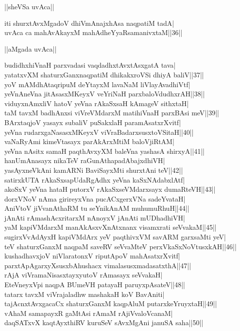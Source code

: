 \documentclass{article}
\begin{document}
\begin{center}
||sheVSa uvAca||
\end{center}

iti shurxtAvxMgadoV dhiVmAnajxhAsa naqpatiM tadA|\\
uvAca ca mahAvAkayxM mahAdheYyaRsamanivxtaM||36||\\

\begin{center}
||aMgada uvAca||
\end{center}

budidhxhiVnaH parxvadasi vaqdadhxtAvxtAsxgatA tava|\\
yatatxvXM shaturxGanxnaqpatiM dhikakxroVSi dhiyA baliV||37||\\
yoV mAMdhAtaqripuM deYtayxM lavaNaM liVlayAvadhiVtf|\\
yeVnAneVna jitAsasxMKeyxV veYriNaH parxbaloVdudhxrAH||38||\\
viduyxnAmxliV hatoV yeVna rAkaSxsaH kAmageV sithxtaH|\\
taM tavxM badhAnxsi viVreVMdarxM matihiVnaH parxBAsi meV||39||\\
BArxtaqjoV yasayx subaliV puSakxlaH paramAsatxrXvitf|\\
yeVna rudarxgaNasasxMKeyxV viVraBadarxsusxtoVSitaH||40||\\
vaNaRyAmi kimeVtasayx parAkArxMtiM baloVjiRtAM|\\
yeVna nAsitx samaH paqthAvxyXM baleVna yashasA shirxyA||41||\\
hanUmAnasayx nikaTeV raGunAthapadAbajxdhiVH|\\
yasAyxneVkAni kamARNi BaviSayxMti shurxtAni teV||42||\\
satirxkUTA rAkaSxsapUdaRgAdhx yeVna kaSxNAdabxlAtf|\\
akoSxV yeVna hataH putorxV rAkaSxseVMdarxsayx dumaRteVH||43||\\
dorxVNoV nAma girireyxVna pucACxgerxVNa sadeYvataH|\\
AniVtoV jiVvanAthaRM tu seYnikAnAM muhumuRhuH||44||\\
jAnAti rAmashAcxritarxM nAnoyxV jAnAti mUDhadhiVH|\\
yaM kapiVMdarxM manAkAsxvXnAtxnanx visamxrati seVvakaM||45||\\
sugirxVvAdAyxH kapiVMdArx yeV paqthivxVM savARM garxsaMti yeV|\\
teV shaturxGanxM naqpaM saveRV seVvaMteV perxVkaSxNoVtusxkAH||46||\\
kushadhavxjoV niVlaratonxV riputApoV mahAsatxrXvitf|\\
parxtApAgarxyXsusxbAhushacx vimalasusxmadasatxthA||47||\\
rAjA viVramaNisasxtayxyutoV rAmasayx seVvakaH|\\
EteVneyxVpi naqpA BUmeVH patayaH paruyxpAsateV||48||\\
tatarx tavxM viVrajaladhw mashakaH koV BavAniti|\\
tajAcnxtAvxgacaCx shaturxGanxM kaqpAluM putarxkeYruyxtaH||49||\\
vAhaM samapayxR gaMtAsi rAmaM rAjiVvaloVcanaM|\\
daqSATxvX kaqtAyxthiRV kuruSeV sAvxMgAni januSA saha||50||\\
\end{document}
